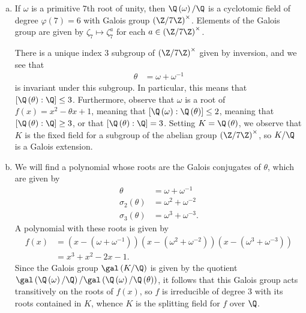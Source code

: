 \documentclass[10pt]{mypackage}
\begin{document}
\begin{solution}\hfill
  \begin{enumerate}[(a)]
    \item If $\omega$ is a primitive $7$th root of unity, then $\Q\left( \omega \right)/\Q$ is a cyclotomic field of degree $\varphi(7) = 6$ with Galois group $\left( \Z/7\Z \right)^{\times}$. Elements of the Galois group are given by $\zeta_7\mapsto \zeta_7^{a}$ for each $a \in \left( \Z/7\Z \right)^{\times}$.

      There is a unique index $3$ subgroup of $\left( \Z/7\Z \right)^{\times}$ given by inversion, and we see that
      \begin{align*}
        \theta &= \omega + \omega^{-1}
      \end{align*}
      is invariant under this subgroup. In particular, this means that $\left[ \Q\left( \theta \right):\Q \right] \leq 3$. Furthermore, observe that $\omega$ is a root of $f(x) = x^2 - \theta x + 1$, meaning that $\left[ \Q\left( \omega \right):\Q\left( \theta \right) \right] \leq 2$, meaning that $\left[ \Q\left( \theta \right):\Q \right]\geq 3$, or that $\left[ \Q\left( \theta \right) : \Q \right] = 3$. Setting $K = \Q\left( \theta \right)$, we observe that $K$ is the fixed field for a subgroup of the abelian group $\left( \Z/7\Z \right)^{\times}$, so $K/\Q$ is a Galois extension.
    \item We will find a polynomial whose roots are the Galois conjugates of $\theta$, which are given by
      \begin{align*}
        \theta &= \omega + \omega^{-1}\\
        \sigma_2\left( \theta \right) &= \omega^2 + \omega^{-2}\\
        \sigma_3\left( \theta \right) &= \omega^3 + \omega^{-3}.
      \end{align*}
      A polynomial with these roots is given by
      \begin{align*}
        f(x) &= \left( x-\left( \omega + \omega^{-1} \right) \right)\left( x-\left( \omega^2 + \omega^{-2} \right) \right)\left( x-\left( \omega^3 + \omega^{-3} \right) \right)\\
             &= x^3 + x^2 - 2x - 1.
      \end{align*}
      Since the Galois group $\gal\left( K/\Q \right)$ is given by the quotient $\gal\left( \Q\left( \omega \right)/\Q \right)/\gal\left( \Q\left( \omega \right)/\Q\left( \theta \right) \right)$, it follows that this Galois group acts transitively on the roots of $f(x)$, so $f$ is irreducible of degree $3$ with its roots contained in $K$, whence $K$ is the splitting field for $f$ over $\Q$.
  \end{enumerate}
\end{solution}
\end{document}
